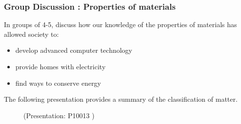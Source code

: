             \subsubsection{  Group Discussion : Properties of materials
      }
            \nopagebreak
      \label{m38706*id67392}In groups of 4-5, discuss how our knowledge of the properties of materials has allowed society to:\par 
      \label{m38706*id67398}\begin{itemize}[noitemsep]
            \label{m38706*uid111}\item develop advanced computer technology
\label{m38706*uid112}\item provide homes with electricity
\label{m38706*uid113}\item find ways to conserve energy
\end{itemize}
\label{m38706*eip-968}The following presentation provides a summary of the classification of matter.
    \setcounter{subfigure}{0}
	\begin{figure}[H] %
    \label{m38706*slidesharemedia}\label{m38706*slideshareflash} { (Presentation:  P10013 )}
      \vspace{2pt}
    \vspace{.1in}
 \end{figure}       \par \label{m38706*cid9}
